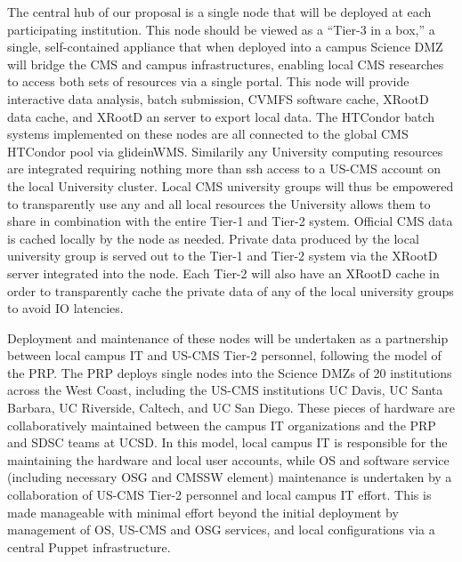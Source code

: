 \documentclass[11pt,a4paper]{article}
\begin{document}
The central hub of our proposal is a single node that will be deployed at each participating institution.  This node should be viewed as a ``Tier-3 in a box,'' a single, self-contained appliance that when deployed into a campus Science DMZ will bridge the CMS and campus infrastructures, enabling local CMS researches to access both sets of resources via a single portal.  This node will provide interactive data analysis, batch submission, CVMFS software cache, XRootD data cache, and XRootD an server to export local data.  The HTCondor batch systems implemented on these nodes are all connected to the global CMS HTCondor pool via glideinWMS.  Similarily any University computing resources are integrated requiring nothing more than ssh access to a US-CMS account on the local University cluster.  Local CMS university groups will thus be empowered to transparently use any and all local resources the University allows them to share in combination with the entire Tier-1 and Tier-2 system. Official CMS data is cached locally by the node as needed.  Private data produced by the local university group is served out to the Tier-1 and Tier-2 system via the XRootD server integrated into the node.  Each Tier-2 will also have an XRootD cache in order to transparently cache the private data of any of the local university groups to avoid IO latencies. 

Deployment and maintenance of these nodes will be undertaken as a partnership between local campus IT and US-CMS Tier-2 personnel, following the model of the PRP.  The PRP deploys single nodes into the Science DMZs of 20 institutions across the West Coast, including the US-CMS institutions UC Davis, UC Santa Barbara, UC Riverside, Caltech, and UC San Diego. These pieces of hardware are collaboratively maintained between the campus IT organizations and the PRP and SDSC teams at UCSD.  In this model, local campus IT is responsible for the maintaining the hardware and local user accounts, while OS and software service (including necessary OSG and CMSSW element) maintenance is undertaken by a collaboration of US-CMS Tier-2 personnel and local campus IT effort.  This is made manageable with minimal effort beyond the initial deployment by management of OS, US-CMS and OSG services, and local configurations via a central Puppet infrastructure.
\end{document}
